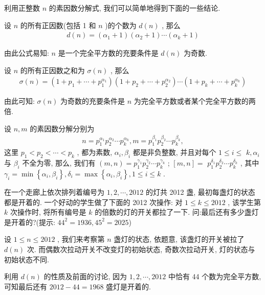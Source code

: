 利用正整数 $n$ 的素因数分解式, 我们可以简单地得到下面的一些结论.
\begin{corollary}
	设 $n$ 的所有正因数(包括 1 和 $n$ )的个数为 $d(n)$ , 那么
	\begin{align*}
		d(n)=\left(\alpha_{1}+1\right)\left(\alpha_{2}+1\right) \cdots\left(\alpha_{k}+1\right)
	\end{align*}
\end{corollary}
由此公式易知: $n$ 是一个完全平方数的充要条件是 $d(n)$ 为奇数.
\begin{corollary}
	设 $n$ 的所有正因数之和为 $\sigma(n)$ , 那么
	\begin{align*}
		\sigma(n)=\left(1+p_{1}+\cdots+p_{1}^{\alpha_{1}}\right)\left(1+p_{2}+\cdots+p_{2}^{\alpha_{2}}\right) \cdots\left(1+p_{k}+\cdots+p_{k}^{\alpha_{k}}\right)
	\end{align*}
\end{corollary}
由此可知:  $\sigma(n)$ 为奇数的充要条件是 $n$ 为完全平方数或者某个完全平方数的两倍.
\begin{corollary}
	设 $n ,  m$ 的素因数分解分别为
	\begin{align*}
		n=p_{1}^{\alpha_{1}} p_{2}^{\alpha_{2}} \cdots p_{k}^{\alpha_{k}}, m=p_{1}^{\beta_{1}} p_{2}^{\beta_{2}} \cdots p_{k}^{\beta_{k}},
	\end{align*}
	这里 $p_{1}<p_{2}<\cdots<p_{k}$ , 都为素数,  $\alpha_{i} ,  \beta_{i}$ 都是非负整数, 并且对每个 $1 \leqslant i \leqslant$ $k, \alpha_{i}$ 与 $\beta_{i}$ 不全为零, 那么, 我们有 $(m, n)=p_{1}^{\gamma_{1}} p_{2}^{\gamma_{2}} \cdots p_{k}^{\gamma_{k}}$ ;  $[m, n]=$ $p_{1}^{\delta_{1}} p_{2}^{\delta_{2}} \cdots p_{k}^{\delta_{k}}$ , 其中 $\gamma_{i}=\min \left\{\alpha_{i}, \beta_{i}\right\}, \delta_{i}=\max \left\{\alpha_{i}, \beta_{i}\right\}, 1 \leqslant i \leqslant k$ .
\end{corollary}

\begin{example}
	在一个走廊上依次排列着编号为 $1,2, \cdots, 2012$ 的灯共 2012 盏, 最初每盏灯的状态都是开着的. 一个好动的学生做了下面的 2012 次操作: 对 $1 \leqslant k \leqslant 2012$ , 该学生第 $k$ 次操作时, 将所有编号是 $k$ 的倍数的灯的开关都拉了一下. 问:最后还有多少盏灯是开着的?(提示: $44^2=1936, 45^2=2025$)
\end{example}
\begin{solution}
	设 $1 \leqslant n \leqslant 2012$ , 我们来考察第 $n$ 盏灯的状态, 依题意, 该盏灯的开关被拉了 $d(n)$ 次. 而偶数次拉动开关不改变灯的初始状态, 奇数次拉动开关, 灯的状态与初始状态不同.

	利用 $d(n)$ 的性质及前面的讨论, 因为 $1,2, \cdots, 2012$ 中恰有 44 个数为完全平方数, 可知最后还有 $2012-44=1968$ 盛灯是开着的.
\end{solution}

